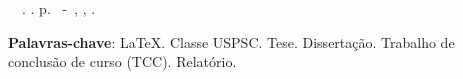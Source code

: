\setlength{\absparsep}{18pt} %
\begin{resumo}
	\begin{flushleft} 
			\setlength{\absparsep}{0pt} %
			\SingleSpacing 
			\imprimirautorabr~~\textbf{\imprimirtituloresumo}.	\imprimirdata. \pageref{LastPage} p. 
			\imprimirtipotrabalho~-~\imprimirinstituicao, \imprimirlocal, \imprimirdata. 
 	\end{flushleft}
\OnehalfSpacing 			

 \textbf{Palavras-chave}: LaTeX. Classe USPSC. Tese. Dissertação. Trabalho de conclusão de curso (TCC). Relatório.
\end{resumo}